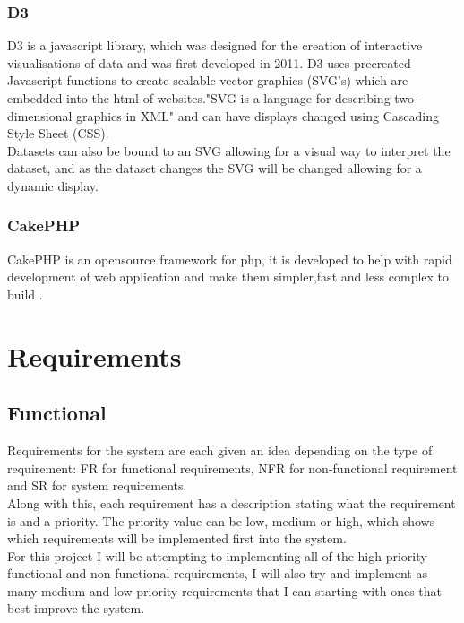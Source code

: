 \documentclass[12pt]{article}  %
\begin{document}
\subsubsection{D3}
D3 \cite{bostock_d3.js_????} is a javascript library, which was designed for the creation of interactive visualisations of data and was first developed in 2011. D3 uses precreated Javascript functions to create scalable vector graphics (SVG's) which are embedded into the html of websites."SVG is a language for describing two-dimensional graphics in XML"\cite{ferraiolo_scalable_2000} and can have displays changed  using Cascading Style Sheet (CSS).  \\
Datasets can also be bound to an SVG allowing for a visual way to interpret the dataset, and as the dataset changes the SVG will be changed allowing for a dynamic display.  

\subsubsection{CakePHP}
CakePHP is an opensource framework for php, it is developed to help with rapid development of web application and make them simpler,fast and less complex to build \cite{_cakephp_????}. 
  





\newpage
\section{Requirements}
 


\subsection{Functional}
Requirements for the system are each given an idea depending on the type of requirement: FR for functional requirements, NFR for non-functional requirement and SR for system requirements.\\
Along with this, each requirement has a description stating what the requirement is and a priority. The priority value can be low, medium or high, which shows which requirements will be implemented first into the system.\\
For this project I will be attempting to implementing all of the high priority functional and non-functional requirements, I will also try and implement as many medium and low priority requirements that I can starting with ones that best improve the system. 
\end{document}

